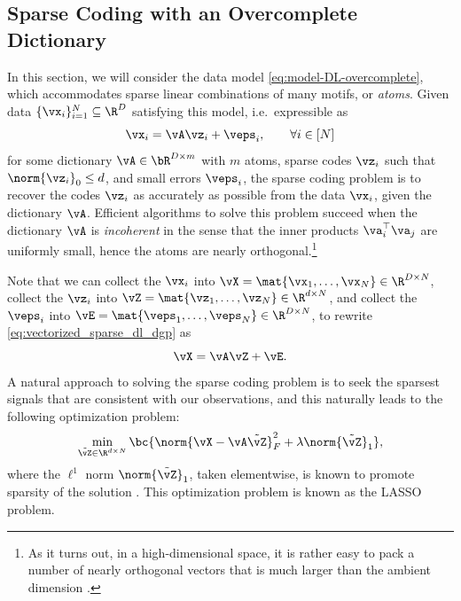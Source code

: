 \documentclass[../../book-main.tex]{subfiles}
\begin{document}
\subsection{Sparse Coding with an Overcomplete Dictionary}

In this section, we will consider the data model
\eqref{eq:model-DL-overcomplete}, which accommodates sparse linear combinations
of many motifs, or \textit{atoms}. Given data \(\{\vx_{i}\}_{i =
    1}^{N} \subseteq
\R^{D}\) satisfying this model, i.e.\ expressible as
\begin{equation}\label{eq:vectorized_sparse_dl_dgp}
    \vx_{i} = \vA\vz_{i} + \veps_{i}, \qquad \forall i \in [N]
\end{equation}
for some dictionary $\vA \in \bR^{D \times m}$ with $m$ atoms, sparse codes
$\vz_i$ such that $\norm{\vz_i}_0 \leq d$, and small errors $\veps_i$,
the sparse coding problem is to recover the codes $\vz_i$ as accurately as
possible from the data $\vx_i$, given the dictionary $\vA$.
Efficient algorithms to solve this problem succeed when
the dictionary \(\vA\) is \textit{incoherent} in the sense that the inner
products \(\va_{i}^{\top}\va_{j}\) are uniformly small, hence the atoms are
nearly orthogonal.\footnote{As it turns out, in a high-dimensional space, it is
    rather easy to pack a number of nearly orthogonal vectors that is
    much larger
than the ambient dimension \cite{Wright-Ma-2022}. }

Note that we can collect the \(\vx_{i}\) into \(\vX = \mat{\vx_{1},
\dots, \vx_{N}} \in \R^{D \times N}\), collect the \(\vz_{i}\) into
\(\vZ = \mat{\vz_{1}, \dots, \vz_{N}} \in \R^{d  \times N}\), and
collect the \(\veps_{i}\) into \(\vE = \mat{\veps_{1}, \dots,
\veps_{N}} \in \R^{D \times N}\), to rewrite
\eqref{eq:vectorized_sparse_dl_dgp} as
\begin{equation}\label{eq:sparse_dl_dgp}
    \vX = \vA\vZ + \vE.
\end{equation}
A natural approach to solving the sparse coding problem is to seek the sparsest
signals that are consistent with our observations, and this naturally leads to
the following optimization problem:
\begin{equation}\label{eq:sparse_dl_lasso}
    \min_{\tilde{\vZ} \in \R^{d \times N}}\bc{\norm{\vX -
        \vA\tilde{\vZ}}_{F}^{2} +
    \lambda \norm{\tilde{\vZ}}_{1}},
\end{equation}
where the \(\ell^1\) norm \(\norm{\tilde{\vZ}}_{1}\), taken elementwise, is
known to promote sparsity of the solution \cite{Wright-Ma-2022}.
This optimization problem is known as the LASSO problem.
\end{document}
